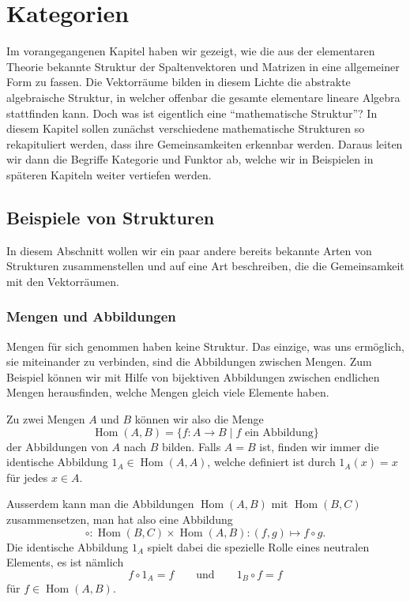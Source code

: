%
%
%
\chapter{Kategorien%
\label{chapter:kategorien}}
\rhead{}
Im vorangegangenen Kapitel haben wir gezeigt, wie die aus der
elementaren Theorie bekannte Struktur der Spaltenvektoren und
Matrizen in eine allgemeiner Form zu fassen.
Die Vektorräume bilden in diesem Lichte die abstrakte algebraische Struktur,
in welcher offenbar die gesamte elementare lineare Algebra stattfinden
kann.
Doch was ist eigentlich eine ``mathematische Struktur''?
In diesem Kapitel sollen zunächst verschiedene mathematische Strukturen
so rekapituliert werden, dass ihre Gemeinsamkeiten erkennbar werden.
Daraus leiten wir dann die Begriffe Kategorie und Funktor ab, welche
wir in Beispielen in späteren Kapiteln weiter vertiefen werden.

\section{Beispiele von Strukturen}
In diesem Abschnitt wollen wir ein paar andere bereits bekannte
Arten von Strukturen zusammenstellen und auf eine Art beschreiben,
die die Gemeinsamkeit mit den Vektorräumen.

\subsection{Mengen und Abbildungen}
Mengen für sich genommen haben keine Struktur.
Das einzige, was uns ermöglich, sie miteinander zu verbinden, sind die
Abbildungen zwischen Mengen.
Zum Beispiel können wir mit Hilfe von bijektiven Abbildungen zwischen
endlichen Mengen herausfinden, welche Mengen gleich viele Elemente haben.

Zu zwei Mengen $A$ und $B$ können wir also die Menge 
\[
\operatorname{Hom}(A,B)
=
\{ f\colon A\to B\;|\; \text{$f$ ein Abbildung}\}
\]
der Abbildungen von $A$ nach $B$ bilden.
Falls $A=B$ ist, finden wir immer die identische Abbildung
$1_{A}\in \operatorname{Hom}(A,A)$, welche definiert ist durch
$1_A(x)=x$
für jedes $x\in A$.

Ausserdem kann man die Abbildungen
$\operatorname{Hom}(A,B)$
mit
$\operatorname{Hom}(B,C)$
zusammensetzen, man hat also eine Abbildung
\[
\circ
\colon
\operatorname{Hom}(B,C)
\times
\operatorname{Hom}(A,B)
:
(f,g)
\mapsto
f\circ g.
\]
Die identische Abbildung $1_A$ spielt dabei die spezielle Rolle eines
neutralen Elements,
es ist nämlich
\[
f\circ 1_A
=
f
\qquad\text{und}\qquad
1_B \circ f = f
\]
für $f\in\operatorname{Hom}(A,B)$.

